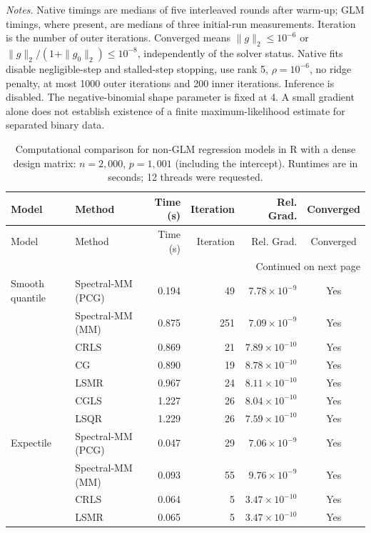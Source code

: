 \documentclass[10pt,a4paper]{article}
\begin{document}
\noindent\textit{Notes.} Native timings are medians of five interleaved rounds after warm-up; GLM timings, where present, are medians of three initial-run measurements. Iteration is the number of outer iterations. Converged means $\|g\|_2\leq10^{-6}$ or $\|g\|_2/(1+\|g_0\|_2)\leq10^{-8}$, independently of the solver status. Native fits disable negligible-step and stalled-step stopping, use rank 5, $\rho=10^{-6}$, no ridge penalty, at most 1000 outer iterations and 200 inner iterations. Inference is disabled.
The negative-binomial shape parameter is fixed at 4. A small gradient alone does not establish existence of a finite maximum-likelihood estimate for separated binary data.
\par
\endgroup

\clearpage
\begingroup
\small
\setlength{\tabcolsep}{5pt}
\begin{longtable}{llrrrc}
\caption{Computational comparison for non-GLM regression models in R with a dense design matrix: $n=2{,}000$, $p=1{,}001$ (including the intercept). Runtimes are in seconds; 12 threads were requested.}
\label{tab:R-dense-nonglm-strict}\\
\toprule
Model & Method & Time (s) & Iteration & Rel. Grad. & Converged \\
\midrule
\endfirsthead
\toprule
Model & Method & Time (s) & Iteration & Rel. Grad. & Converged \\
\midrule
\endhead
\midrule
\multicolumn{6}{r}{Continued on next page}\\
\endfoot
\bottomrule
\endlastfoot
Smooth quantile & Spectral-MM (PCG) & 0.194 & 49 & $7.78\times10^{-9}$ & Yes \\
 & Spectral-MM (MM) & 0.875 & 251 & $7.09\times10^{-9}$ & Yes \\
 & CRLS & 0.869 & 21 & $7.89\times10^{-10}$ & Yes \\
 & CG & 0.890 & 19 & $8.78\times10^{-10}$ & Yes \\
 & LSMR & 0.967 & 24 & $8.11\times10^{-10}$ & Yes \\
 & CGLS & 1.227 & 26 & $8.04\times10^{-10}$ & Yes \\
 & LSQR & 1.229 & 26 & $7.59\times10^{-10}$ & Yes \\
\midrule
Expectile & Spectral-MM (PCG) & 0.047 & 29 & $7.06\times10^{-9}$ & Yes \\
 & Spectral-MM (MM) & 0.093 & 55 & $9.76\times10^{-9}$ & Yes \\
 & CRLS & 0.064 & 5 & $3.47\times10^{-10}$ & Yes \\
 & LSMR & 0.065 & 5 & $3.47\times10^{-10}$ & Yes \\

\end{longtable}
\end{document}
